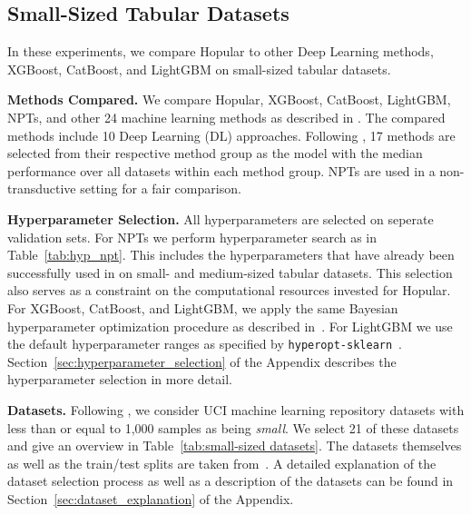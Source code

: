 \documentclass{article}
\theoremstyle{plain}
\theoremstyle{definition}
\theoremstyle{remark}
\begin{document}
\subsection{Small-Sized Tabular Datasets}
\label{sec:experiments_uci}

In these experiments, we compare Hopular to other Deep Learning methods, XGBoost, CatBoost, and LightGBM on small-sized tabular datasets.

{\bf Methods Compared.}
We compare Hopular, XGBoost, CatBoost, LightGBM, NPTs, and other 24 machine learning
methods as described in \citep{Klambauer:17}.
The compared methods include 10 Deep Learning (DL) approaches.
Following \citep{Klambauer:17,Wainberg:16},
17 methods are selected from their respective method group 
as the model with the median performance over all datasets within each method group.
NPTs are used in a non-transductive setting for a fair comparison. 

{\bf Hyperparameter Selection.} 
All hyperparameters are selected on seperate validation sets. For NPTs we perform hyperparameter search as in Table~\ref{tab:hyp_npt}. This includes the hyperparameters that have already been successfully used in \citep{Kossen:21} on small- and medium-sized tabular datasets. 
This selection also serves as a constraint on the computational resources invested for Hopular.
For XGBoost, CatBoost, and LightGBM, we apply the same Bayesian hyperparameter optimization 
procedure as described in~\citep{ShwartzZiv:21}. For LightGBM we use the default hyperparameter ranges as specified by \texttt{hyperopt-sklearn}~\citep{Komer:14}.
Section~\ref{sec:hyperparameter_selection} of the Appendix describes the hyperparameter selection in more detail.

{\bf Datasets.} 
Following \citep{Klambauer:17}, 
we consider UCI machine learning repository datasets 
with less than or equal to 1,000 samples as being {\em small}.
We select 21 of these datasets and give an overview in Table~\ref{tab:small-sized datasets}.
The datasets themselves as well as the train/test splits are taken from~\citep{Fernandez:14}.
A detailed explanation of the dataset selection process as well as a description of the datasets can be found in Section~\ref{sec:dataset_explanation} of the Appendix.
\end{document}
